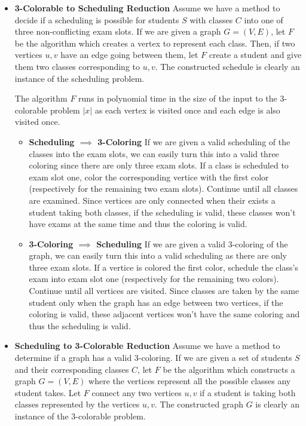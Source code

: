 \documentclass[12pt,twoside]{article}
\begin{document}
\begin{problems}
\begin{problemparts}
\begin{itemize}

  \item {\bf 3-Colorable to Scheduling Reduction} Assume we have a method to
  decide if a scheduling is possible for students $S$ with classes $C$ into
  one of three non-conflicting exam slots. If we are given a graph $G = (V,
  E)$, let $F$ be the algorithm which creates a vertex to represent each class.
  Then, if two vertices $u, v$ have an edge going between them, let $F$
  create a student and give them two classes corresponding to $u, v$. The
  constructed schedule is clearly an instance of the scheduling problem.

  The algorithm $F$ runs in polynomial time in the size of the input to the
  3-colorable problem $|x|$ as each vertex is visited once and each edge is
  also visited once.

  \begin{itemize}

    \item {\bf Scheduling $\implies$ 3-Coloring} If we are given a valid
    scheduling of the classes into the exam slots, we can easily turn this
    into a valid three coloring since there are only three exam slots. If a
    class is scheduled to exam slot one, color the corresponding vertice with
    the first color (respectively for the remaining two exam slots). Continue
    until all classes are examined. Since vertices are only connected when
    their exists a student taking both classes, if the scheduling is valid,
    these classes won't have exams at the same time and thus the coloring is
    valid.

    \item {\bf 3-Coloring $\implies$ Scheduling} If we are given a valid
    3-coloring of the graph, we can easily turn this into a valid scheduling
    as there are only three exam slots. If a vertice is colored the first
    color, schedule the class's exam into exam slot one (respectively for the
    remaining two colors). Continue until all vertices are visited. Since
    classes are taken by the same student only when the graph has an edge
    between two vertices, if the coloring is valid, these adjacent vertices
    won't have the same coloring and thus the scheduling is valid.

  \end{itemize}

  \item {\bf Scheduling to 3-Colorable Reduction} Assume we have a method to
  determine if a graph has a valid 3-coloring. If we are given a set of
  students $S$ and their corresponding classes $C$, let $F$ be the algorithm
  which constructs a graph $G = (V, E)$ where the vertices represent all the
  possible classes any student takes. Let $F$ connect any two vertices $u, v$
  if a student is taking both classes represented by the vertices $u, v$. The
  constructed graph $G$ is clearly an instance of the 3-colorable problem.


\end{itemize}
\end{problemparts}
\end{problems}
\end{document}
